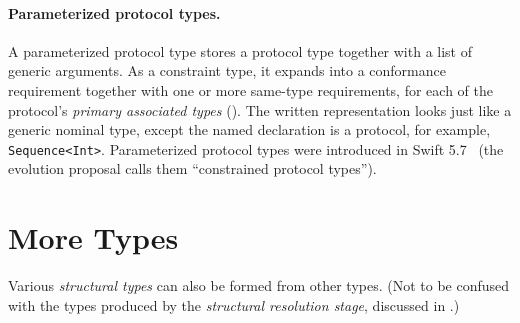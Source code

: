 \documentclass[../generics]{subfiles}
\begin{document}
\paragraph{Parameterized protocol types.}
A parameterized protocol type stores a protocol type together with a list of generic arguments. As a constraint type, it expands into a conformance requirement together with one or more same-type requirements, for each of the protocol's \emph{primary associated types} (). The written representation looks just like a generic nominal type, except the named declaration is a protocol, for example, \texttt{Sequence<Int>}. Parameterized protocol types were introduced in Swift 5.7~\cite{se0346} (the evolution proposal calls them ``constrained protocol types'').

\section{More Types}\label{sec:more types}

Various \emph{structural types} can also be formed from other types. (Not to be confused with the types produced by the \emph{structural resolution stage}, discussed in .)

\begin{figure}
\begin{center}
\end{center}
\end{figure}
\end{document}
